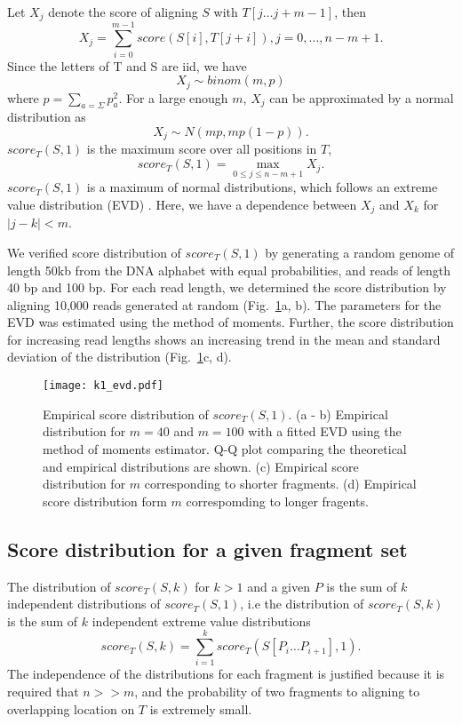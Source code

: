 Let $X_j$ denote the score of aligning $S$ with $T[j \dots j+m-1]$, then
\[X_j = \sum_{i=0}^{m-1} score(S[i],T[j+i]), j = 0, \dots, n-m+1.\]
Since the letters of T and S are iid, we have \[X_j \sim binom(m,p)\]
where $p = \sum_{a=\Sigma} p_a^2$.  For a large enough $m$, $X_j$ can
be approximated by a normal distribution as \[X_j \sim N(mp, mp(1-p)).
\] $score_T(S,1)$ is the maximum score over all positions in $T$,
\[score_T(S,1) = \max_{0 \leq j \leq n-m+1} X_j.\] $score_T(S,1)$ is a
maximum of normal distributions, which follows an extreme value
distribution (EVD) \cite{kotz2000extreme}.
Here, we have a dependence between $X_j$ and $X_k$ for $|j - k| < m$.

We verified score distribution of $score_T(S,1)$ by generating a random
genome of length 50kb from the DNA alphabet with equal probabilities,
and reads of length 40 bp and 100 bp. For each read length, we
determined the score distribution by aligning 10,000 reads generated at
random (Fig.~\ref{evd_approx}a, b). The parameters for the EVD was
estimated using the method of moments.
Further, the score distribution for increasing read lengths shows an
increasing trend in the mean and standard deviation of the distribution
(Fig.~\ref{evd_approx}c, d).

\begin{figure}[H]
\centering
\texttt{[image: k1\_evd.pdf]}
\caption{Empirical score distribution of $score_T(S,1)$. (a - b) Empirical
  distribution for $m=40$ and $m=100$ with a fitted EVD using the method
  of moments estimator. Q-Q plot comparing the theoretical and empirical 
  distributions are shown.
  (c) Empirical score distribution for $m$ corresponding to shorter
  fragments.
  (d) Empirical score distribution form $m$ correspomding to longer
  fragents.}
\label{evd_approx}
\end{figure}



\subsection{Score distribution for a given fragment set}
The distribution of $score_T(S,k)$ for $k > 1$ and a given $P$ is the
sum of $k$ independent distributions of $score_T(S,1)$, i.e the
distribution of $score_T(S,k)$ is the sum of $k$ independent extreme
value distributions \[score_T(S,k) = \sum_{i=1}^{k} score_T(S[P_i \dots
P_{i+1}], 1).\]
The independence of the distributions for each fragment is justified
because it is required that $n >> m$, and the probability of two
fragments to aligning to overlapping location on $T$ is extremely small.

